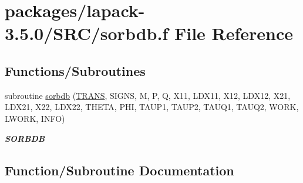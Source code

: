 \hypertarget{sorbdb_8f}{}\section{packages/lapack-\/3.5.0/\+S\+R\+C/sorbdb.f File Reference}
\label{sorbdb_8f}
\subsection*{Functions/\+Subroutines}
\begin{DoxyCompactItemize}
\item 
subroutine \hyperlink{sorbdb_8f_aa04a3d67b4fcd7d82261d71816bce03f}{sorbdb} (\hyperlink{superlu__enum__consts_8h_a0c4e17b2d5cea33f9991ccc6a6678d62a1f61e3015bfe0f0c2c3fda4c5a0cdf58}{T\+R\+A\+N\+S}, S\+I\+G\+N\+S, M, P, Q, X11, L\+D\+X11, X12, L\+D\+X12, X21, L\+D\+X21, X22, L\+D\+X22, T\+H\+E\+T\+A, P\+H\+I, T\+A\+U\+P1, T\+A\+U\+P2, T\+A\+U\+Q1, T\+A\+U\+Q2, W\+O\+R\+K, L\+W\+O\+R\+K, I\+N\+F\+O)
\begin{DoxyCompactList}\small\item\em {\bfseries S\+O\+R\+B\+D\+B} \end{DoxyCompactList}\end{DoxyCompactItemize}


\subsection{Function/\+Subroutine Documentation}
\hypertarget{sorbdb_8f_aa04a3d67b4fcd7d82261d71816bce03f}{}
